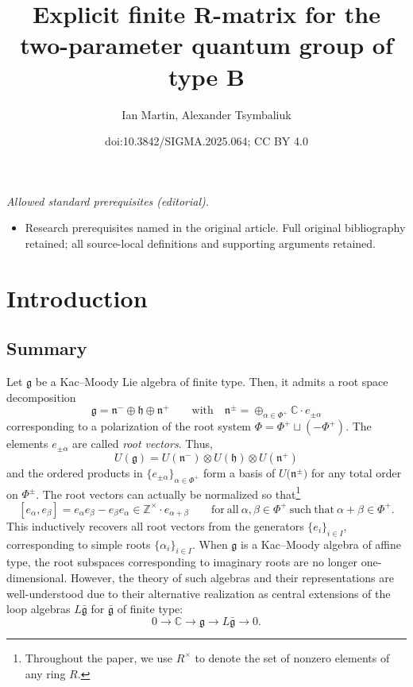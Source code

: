 \documentclass[10pt,a4paper]{amsart}
\title{Explicit finite R-matrix for the two-parameter quantum group of type B}
\author{Ian Martin, Alexander Tsymbaliuk}
\date{doi:10.3842/SIGMA.2025.064; CC BY 4.0}
\numberwithin{equation}{section}
\newcommand{\fg}{\mathfrak{g}}
\newcommand{\fn}{\mathfrak{n}}
\newcommand{\fh}{\mathfrak{h}}
\newcommand{\BZ}{\mathbb{Z}}
\newcommand{\BC}{\mathbb{C}}
\begin{document}
\maketitle
\noindent\textit{Allowed standard prerequisites (editorial).}\begin{itemize}
\item Research prerequisites named in the original article. Full original bibliography retained; all source-local definitions and supporting arguments retained.
\end{itemize}\medskip
\section{Introduction}%

\subsection{Summary}%

Let $\fg$ be a Kac--Moody Lie algebra of finite type. Then, it admits a root space decomposition
\[
\fg=\fn^- \oplus \fh \oplus \fn^+ \qquad \text{with}\quad \fn^{\pm}=\oplus_{\alpha\in \Phi^+} \BC\cdot e_{\pm \alpha}
\]
 corresponding to a polarization of the root system $\Phi=\Phi^+ \sqcup (-\Phi^+)$. The elements $e_{\pm \alpha}$ are called \textit{root vectors}. Thus,
 \[
 U(\fg)=U(\fn^-) \otimes U(\fh) \otimes U(\fn^+)
 \]
 and the ordered products in $\{e_{\pm \alpha}\}_{\alpha\in \Phi^+}$ form a basis of $U\bigl(\fn^\pm\bigr)$ for any total order on $\Phi^\pm$. The root vectors can actually be normalized so that\footnote{Throughout the paper, we use $R^\times$ to denote the set of nonzero elements of any ring $R$.}
\begin{equation}\label{eqn:Lie-root-vectors}
 [e_{\alpha},e_{\beta}] = e_{\alpha}e_{\beta}-e_{\beta}e_{\alpha} \in \BZ^\times \cdot e_{\alpha+\beta}
 \qquad \mathrm{for\ all} \ \alpha, \beta \in \Phi^+ \ \mathrm{such\ that} \ \alpha+\beta \in \Phi^+.
\end{equation}
This inductively recovers all root vectors from the generators $\{e_i\}_{i\in I}$, corresponding to simple roots $\{\alpha_i\}_{i\in I}$. When $\fg$ is a Kac--Moody algebra of affine type, the root subspaces corresponding to imaginary roots are no longer one-dimensional. However, the theory of such algebras and their representations are well-understood due to their alternative realization as central extensions of the loop algebras $L\bar{\fg}$ for $\bar{\fg}$ of finite type:
\begin{equation}\label{eq:affLie-loop}
 0\to \BC \to \fg\to L\bar{\fg}\to 0.
\end{equation}
\end{document}
